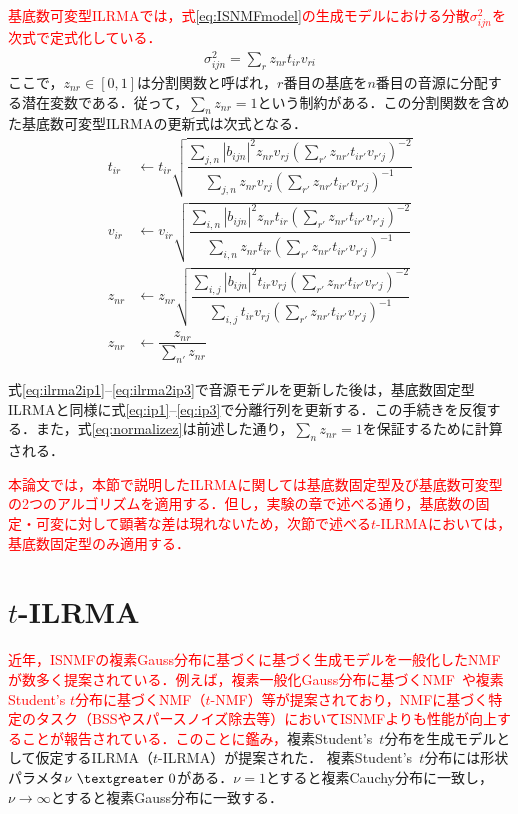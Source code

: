 \textcolor{red}{基底数可変型ILRMAでは，式\eqref{eq:ISNMFmodel}の生成モデルにおける分散$\sigma_{ijn}^2$を次式で定式化している．}
\begin{align}
\sigma_{ijn}^2 = \sum_{r} z_{nr}t_{ir}v_{ri}
\end{align}ここで，$z_{nr}\in [0, 1]$は分割関数と呼ばれ，$r$番目の基底を$n$番目の音源に分配する潜在変数である．従って，$\sum_{n} z_{nr} = 1$という制約がある．この分割関数を含めた基底数可変型ILRMAの更新式は次式となる．
\begin{align}
t_{ir}&\leftarrow t_{ir}\sqrt{\dfrac{\sum _{j,n}\left| b_{ijn}\right| ^{2}z_{nr}v_{rj}\left( \sum _{r'}z_{nr'}t_{ir'}v_{r'j}\right) ^{-2}}{\sum _{j,n}z_{nr}v_{rj}\left( \sum _{r'}z_{nr'}t_{ir'}v_{r'j}\right) ^{-1}}} \label{eq:ilrma2ip1} \\
v_{ir}&\leftarrow v_{ir}\sqrt{\dfrac{\sum _{i,n}\left| b_{ijn}\right| ^{2}z_{nr}t_{ir}\left( \sum _{r'}z_{nr'}t_{ir'}v_{r'j}\right) ^{-2}}{\sum _{i,n}z_{nr}t_{ir}\left( \sum _{r'}z_{nr'}t_{ir'}v_{r'j}\right) ^{-1}}} \label{eq:ilrma2ip2} \\
z_{nr}&\leftarrow z_{nr}\sqrt{\dfrac{\sum _{i,j}\left| b_{ijn}\right| ^{2}t_{ir}v_{rj}\left( \sum _{r'}z_{nr'}t_{ir'}v_{r'j}\right) ^{-2}}{\sum _{i,j}t_{ir}v_{rj}\left( \sum _{r'}z_{nr'}t_{ir'}v_{r'j}\right) ^{-1}}} \label{eq:ilrma2ip3} \\
z_{nr}&\leftarrow \dfrac{z_{nr}}{\sum _{n'}z_{nr}} \label{eq:normalizez}
\end{align}

式\eqref{eq:ilrma2ip1}--\eqref{eq:ilrma2ip3}で音源モデルを更新した後は，基底数固定型ILRMAと同様に式\eqref{eq:ip1}--\eqref{eq:ip3}で分離行列を更新する．この手続きを反復する．また，式\eqref{eq:normalizez}は前述した通り，$\sum_{n} z_{nr} = 1$を保証するために計算される．

\textcolor{red}{本論文では，本節で説明したILRMAに関しては基底数固定型及び基底数可変型の2つのアルゴリズムを適用する．但し，実験の章で述べる通り，基底数の固定・可変に対して顕著な差は現れないため，次節で述べる$t$-ILRMAにおいては，基底数固定型のみ適用する．}

\section{$t$-ILRMA}
\label{sec:conv:tilrma}

\textcolor{red}{近年，ISNMFの複素Gauss分布に基づくに基づく生成モデルを一般化したNMFが数多く提案されている．例えば，複素一般化Gauss分布に基づくNMF~\cite{GGD}や複素Student's $t$分布に基づくNMF（$t$-NMF）\cite{tnmf}等が提案されており，NMFに基づく特定のタスク（BSSやスパースノイズ除去等）においてISNMFよりも性能が向上することが報告されている．このことに鑑み，}複素Student's~$t$分布を生成モデルとして仮定するILRMA（$t$-ILRMA）が提案された\cite{tdist1, tdist2}．
複素Student's~$t$分布には形状パラメタ$\nu~\textgreater~0$がある．$\nu=1$とすると複素Cauchy分布に一致し，$\nu\rightarrow \infty$とすると複素Gauss分布に一致する．

